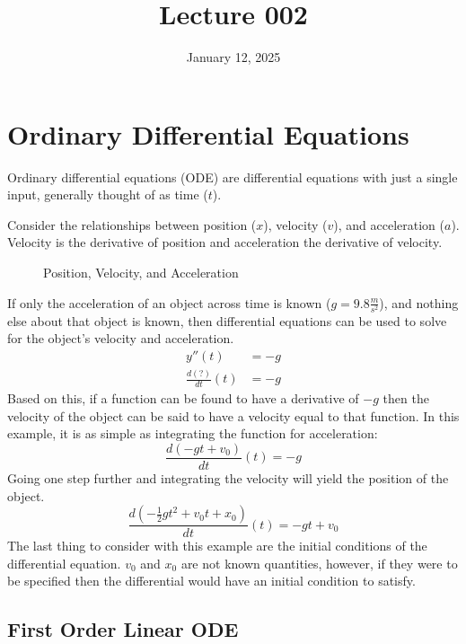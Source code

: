 \documentclass[12pt]{article}
\title{Lecture 002}
\date{January 12, 2025}
\begin{document}
\setcounter{equation}{0}
\newpage

\section{Ordinary Differential Equations}
\label{sec:ordinaryDifferentialEquations}

Ordinary differential equations (ODE) are differential equations with just a single input, generally thought of as time ($t$).

Consider the relationships between {\color{re} position} ($x$), {\color{gr} velocity} ($v$), and {\color{bl} acceleration} ($a$). Velocity is the derivative of position and acceleration the derivative of velocity.

\begin{figure}[H]
  \centering
  
  \caption{Position, Velocity, and Acceleration}
  \label{fig:001}
\end{figure}

If only the acceleration of an object across time is known ($g = 9.8 \frac{m}{s^2}$), and nothing else about that object is known, then differential equations can be used to solve for the object's velocity and acceleration.
\begin{align*}
  y''(t) &= -g \\
  \frac{d(?)}{dt}(t) &= -g
\end{align*}
Based on this, if a function can be found to have a derivative of $-g$ then the velocity of the object can be said to have a velocity equal to that function. In this example, it is as simple as integrating the function for acceleration:
\begin{equation*}
  \frac{d(-gt + v_0)}{dt}(t) = -g
\end{equation*}
Going one step further and integrating the velocity will yield the position of the object.
\begin{equation*}
  \frac{d\left(-\frac{1}{2}gt^2+v_0t+x_0\right)}{dt}(t) = -gt + v_0
\end{equation*}
The last thing to consider with this example are the initial conditions of the differential equation. $v_0$ and $x_0$ are not known quantities, however, if they were to be specified then the differential would have an initial condition to satisfy.

\subsection{First Order Linear ODE}
\label{ssec:firstOrderLinearODE}
\end{document}
